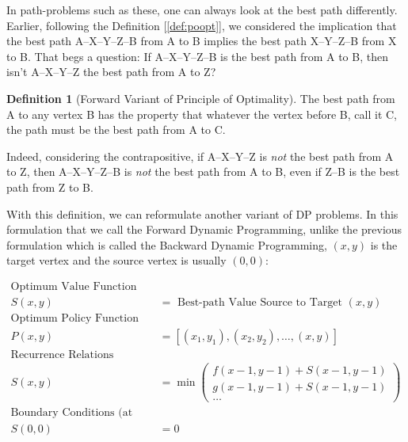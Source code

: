 \documentclass[english,notitlepage,smartquotes]{hgbreport}
\theoremstyle{definition}
\newtheorem{definition}{Definition}
\theoremstyle{definition}
\theoremstyle{remark}
\theoremstyle{definition}
\theoremstyle{plain}
\theoremstyle{definition}
\begin{document}
In path-problems such as these, one can always look at the best path differently. Earlier, following the Definition [\ref{def:poopt}], we considered the implication that the best path A--X--Y--Z--B from A to B implies the best path X--Y--Z--B from X to B. That begs a question: If A--X--Y--Z--B is the best path from A to B, then isn't A--X--Y--Z the best path from A to Z?
\begin{definition}[Forward Variant of Principle of Optimality]
\label{def:pooptforward}
The best path from A to any vertex B has the property that whatever the vertex before B, call it C, the path must be the best path from A to C.
\end{definition}
Indeed, considering the contrapositive, if A--X--Y--Z is \emph{not} the best path from A to Z, then A--X--Y--Z--B is \emph{not} the best path from A to B, even if Z--B is the best path from Z to B.

With this definition, we can reformulate another variant of DP problems. In this formulation that we call the Forward Dynamic Programming, unlike the previous formulation which is called the Backward Dynamic Programming, $(x,y)$ is the target vertex and the source vertex is usually $(0,0)$:

\begin{equation}
\begin{aligned}
\text{Optimum Value Function}\\ 
S(x,y)&=\text{ Best-path Value Source to Target $(x,y)$}\\
\text{Optimum Policy Function}\\
P(x,y)&=[(x_1,y_1),(x_2,y_2),\dots,(x,y)] \\
\text{Recurrence Relations}\\
S(x,y)&=
\min\begin{pmatrix}
f(x-1,y-1)+S(x-1,y-1)\\
g(x-1,y-1)+S(x-1,y-1)\\
\dots
\end{pmatrix}\\
\text{Boundary Conditions (at Source)}\\
S(0,0)&=0
\label{eq:fwddp1}
\end{aligned}
\end{equation}
\end{document}
